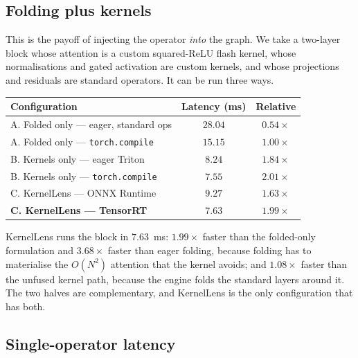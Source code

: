 \documentclass[10pt]{article}
\begin{document}
\subsection{Folding plus kernels}

This is the payoff of injecting the operator \emph{into} the graph. We take a
two-layer block whose attention is a custom squared-ReLU flash kernel, whose
normalisations and gated activation are custom kernels, and whose projections and
residuals are standard operators. It can be run three ways.

\begin{center}
\small
\begin{tabular}{lc c}
\toprule
\textbf{Configuration} & \textbf{Latency (ms)} & \textbf{Relative} \\ \midrule
A. Folded only --- eager, standard ops & $28.04$ & $0.54\times$ \\
A. Folded only --- \texttt{torch.compile} & $15.15$ & $1.00\times$ \\ \midrule
B. Kernels only --- eager Triton & $8.24$ & $1.84\times$ \\
B. Kernels only --- \texttt{torch.compile} & $7.55$ & $2.01\times$ \\ \midrule
C. KernelLens --- ONNX Runtime & $9.27$ & $1.63\times$ \\
\textbf{C. KernelLens --- TensorRT} & $\mathbf{7.63}$ & $\mathbf{1.99\times}$ \\
\bottomrule
\end{tabular}
\label{tab:folding}
\end{center}

KernelLens runs the block in $7.63$~ms: $1.99\times$ faster than the folded-only
formulation and $3.68\times$ faster than eager folding, because folding has to
materialise the $O(N^2)$ attention that the kernel avoids; and $1.08\times$ faster
than the unfused kernel path, because the engine folds the standard layers around
it. The two halves are complementary, and KernelLens is the only configuration
that has both.

\subsection{Single-operator latency}
\end{document}
